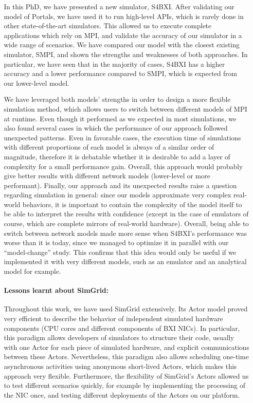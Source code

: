 In this PhD, we have presented a new simulator, S4BXI. After validating our
model of Portals, we have used it to run high-level APIs, which is rarely done
in other state-of-the-art simulators. This allowed us to execute complete
applications which rely on MPI, and validate the accuracy of our simulator in a
wide range of scenarios. We have compared our model with the closest existing
simulator, SMPI, and shown the strengths and weaknesses of both approaches. In
particular, we have seen that in the majority of cases, S4BXI has a higher
accuracy and a lower performance compared to SMPI, which is expected from our
lower-level model.

We have leveraged both models' strengths in order to design a more flexible
simulation method, which allows users to switch between different models of MPI
at runtime. Even though it performed as we expected in most simulations, we also
found several cases in which the performance of our approach followed unexpected
patterns. Even in favorable cases, the execution time of simulations with
different proportions of each model is always of a similar order of magnitude,
therefore it is debatable whether it is desirable to add a layer of complexity
for a small performance gain. Overall, this approach would probably give better
results with different network models (lower-level or more performant). Finally,
our approach and its unexpected results raise a question regarding simulation in
general: since our models approximate very complex real-world behaviors, it is
important to contain the complexity of the model itself to be able to interpret
the results with confidence (except in the case of emulators of course, which
are complete mirrors of real-world hardware). Overall, being able to switch
between network models made more sense when S4BXI's performance was worse than
it is today, since we managed to optimize it in parallel with our
``model-change'' study. This confirms that this idea would only be useful if we
implemented it with very different models, such as an emulator and an analytical
model for example.

\paragraph{Lessons learnt about SimGrid:} Throughout this work, we have used
SimGrid extensively. Its Actor model proved very efficient to describe the
behavior of independent simulated hardware components (CPU cores and different
components of BXI NICs). In particular, this paradigm allows developers of
simulators to structure their code, usually with one Actor for each piece of
simulated hardware, and explicit communications between these Actors.
Nevertheless, this paradigm also allows scheduling one-time asynchronous
activities using anonymous short-lived Actors, which makes this approach very
flexible. Furthermore, the flexibility of SimGrid's Actors allowed us to test
different scenarios quickly, for example by implementing the processing of the
NIC once, and testing different deployments of the Actors on our platform.


